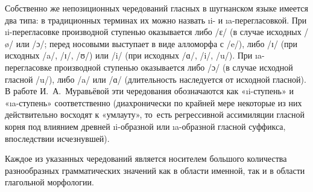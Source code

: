 Собственно же непозиционных чередований гласных в шугнанском языке имеется два типа: в традиционных терминах их можно назвать \i{i}- и \i{a}-перегласовкой. При \i{i}-перегласовке производной ступенью оказывается либо /ɛ/ (в случае исходных /ø/ или /ɔ/; перед носовыми выступает в виде алломорфа с /e/), либо /ɪ/ (при исходных /a/, /ɪ/, /ʊ/) или /i/ (при исходных /ɑ/, /i/, /u/). При \i{a}-перегласовке производной ступенью оказывается либо /ɔ/ (в случае исходной гласной /u/), либо /a/ или /ɑ/ (длительность наследуется от исходной гласной). В работе И.~А.~Муравьёвой эти чередования обозначаются как «\i{i}-ступень» и «\i{a}-ступень» соответственно (диахронически по крайней мере некоторые из них действительно восходят к «умлауту», то~есть регрессивной ассимиляции гласной корня под влиянием древней \i{i}-образной или \i{a}-образной гласной суффикса, впоследствии исчезнувшей).

Каждое из указанных чередований является носителем большого количества разнообразных грамматических значений как в области именной, так и в области глагольной морфологии. 

